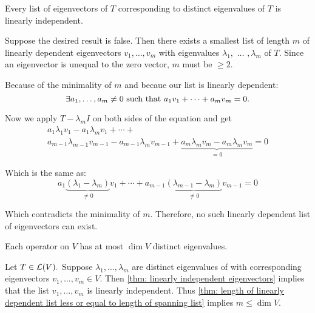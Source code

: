 \setcounter{thm}{10}
\begin{thm}
  \label{thm: linearly independent eigenvectors}
  Every list of eigenvectors of $T$ corresponding to distinct eigenvalues of $T$ is linearly independent.
\end{thm}
\begin{prf}
  Suppose the desired result is false. Then there exists a smallest list of length $m$ of linearly depen\-dent eigenvectors $v_1, \dots, v_m$ with eigenvalues $\lambda_1,$ $\dots$ $,\lambda_m$ of $T$. Since an eigenvector is unequal to the zero vector, $m$ must be $\geq 2$.
  
  Because of the minimality of $m$ and becaue our list is linearly dependent: 
  \begin{equation}
    \exists a_1, \dots, a_m \neq 0$ such that $a_1 v_1 + \cdots + a_m v_m = 0. 
  \end{equation}
  
  Now we apply $T-\lambda_m I$ on both sides of the equation and get
  \begin{equation}
    \begin{gathered}
      a_1 \lambda_1 v_1 - a_1 \lambda_m v_1
      + \cdots + \\
      a_{m-1} \lambda_{m-1} v_{m-1} - a_{m-1} \lambda_{m} v_{m-1} +
      \underbrace{a_m \lambda_m v_m -a_m \lambda_m v_m}_{=0} =0
    \end{gathered}
  \end{equation}
  
  Which is the same as:
  \begin{equation}
    a_1 \underbrace{(\lambda_1 - \lambda_m)}_{\neq 0} v_1 + \cdots + a_{m-1} \underbrace{(\lambda_{m-1}-\lambda_{m})}_{\neq 0} v_{m-1}=0
  \end{equation}
  
  Which contradicts the minimality of $m$. Therefore, no such linearly dependent list of eigenvectors can exist.
\end{prf}

\begin{thm}
  \label{thm: operator cannot have more eigenvalues than dimension of vector space}
  Each operator on $V$ has at most $\dim V$ distinct eigenvalues.
\end{thm}
\begin{prf}
  Let $T \in \mathcal{L}(V).$ Suppose $\lambda_1, \ldots, \lambda_m$ are distinct eigenvalues of with corresponding eigenvectors $v_1, \ldots, v_m \in V$. Then \ref{thm: linearly independent eigenvectors} implies that the list $v_1, \ldots, v_m$ is linearly independent. Thus \ref{thm: length of linearly dependent list less or equal to length of spanning list}
  implies $m \leq \dim V$.
\end{prf}



